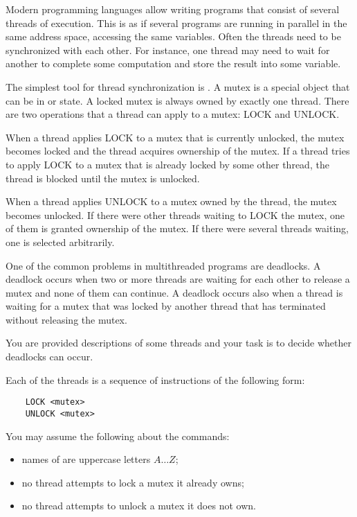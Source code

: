 \newpage
Modern programming languages allow writing programs that consist of several threads
of execution. This is as if several programs are running in parallel in the same
address space, accessing the same variables. Often the threads need to be synchronized
with each other. For instance, one thread may need to wait for another to complete some
computation and store the result into some variable.

The simplest tool for thread synchronization is . A mutex is a special object that
can be in  or  state. A locked mutex is always owned by exactly
one thread. There are two operations that a thread can apply to a mutex: LOCK and UNLOCK.

When a thread applies LOCK to a mutex that is currently unlocked, the mutex becomes
locked and the thread acquires ownership of the mutex. If a thread tries to apply
LOCK to a mutex that is already locked by some other thread, the thread is blocked
until the mutex is unlocked.

When a thread applies UNLOCK to a mutex owned by the thread, the mutex becomes unlocked.
If there were other threads waiting to LOCK the mutex, one of them is granted ownership
of the mutex. If there were several threads waiting, one is selected arbitrarily.

One of the common problems in multithreaded programs are deadlocks. A deadlock occurs when 
two or more threads are waiting for each other to release a mutex and none of them can 
continue. A deadlock occurs also when a thread is waiting for a mutex that was locked 
by another thread that has terminated without releasing the mutex.

You are provided descriptions of some threads and your task is to decide whether
deadlocks can occur.

Each of the threads is a sequence of instructions of the following form:
\begin{verbatim}
    LOCK <mutex>
    UNLOCK <mutex>
\end{verbatim}
You may assume the following about the commands:
\begin{itemize}
\item    names of  are uppercase letters $A\ldots Z$;
\item    no thread attempts to lock a mutex it already owns;
\item    no thread attempts to unlock a mutex it does not own.
\end{itemize}

